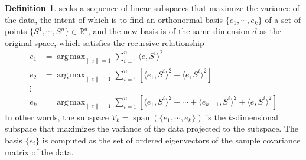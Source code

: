 \documentclass[a4paper]{article}
\theoremstyle{definition}
\newtheorem{definition}{Definition}
\theoremstyle{plain}
\DeclareMathOperator*{\argmax}{arg\,max}
\begin{document}
\begin{definition}
 seeks a sequence of linear subspaces that maximize the variance of the data, the intent of which is to find an orthonormal basis $\{e_1,\cdots,e_k\}$ of a set of points $\{S^1,\cdots,S^n\}\in\mathbb{R}^d$, and the new basis is of the same dimension $d$ as the original space, which satisfies the recursive relationship
\begin{align*}
    e_1&=\argmax_{\|e\|=1}\sum^n_{i=1}\langle e,S^i\rangle^2\\
    e_2&=\argmax_{\|e\|=1}\sum^n_{i=1}[\langle e_1,S^i\rangle^2+\langle e,S^i\rangle^2]\\
    \vdots\\
    e_k&=\argmax_{\|e\|=1}\sum^n_{i=1}[\langle e_1,S^i\rangle^2+\cdots+\langle e_{k-1},S^i\rangle^2+\langle e,S^i\rangle^2]
\end{align*}
In other words, the subspace $V_k=\operatorname{span}(\{e_1,\cdots,e_k\})$ is the $k$-dimensional subspace that maximizes the variance of the data projected to the subspace. The basis $\{e_i\}$ is computed as the set of ordered eigenvectors of the sample covariance matrix of the data.
\end{definition}
\end{document}
